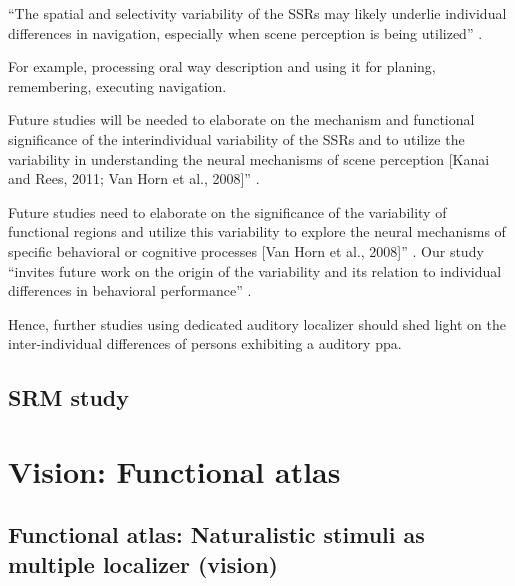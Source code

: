 ``The spatial and selectivity variability of the SSRs may likely underlie
individual differences in navigation, especially when scene perception is being
utilized'' \citep{zhen2017quantifying}.

%
For example, processing oral way description and using it for planing,
remembering, executing navigation.

%
Future studies will be needed to elaborate on the mechanism and functional
significance of the interindividual variability of the SSRs and to utilize the
variability in understanding the neural mechanisms of scene perception [Kanai
and Rees, 2011; Van Horn et al., 2008]'' \citep{zhen2017quantifying}.

%
Future studies need to elaborate on the significance of the variability of
functional regions and utilize this variability to explore the neural mechanisms
of specific behavioral or cognitive processes [Van Horn et al., 2008]''
\citep{zhen2015quantifying}.
%
Our study ``invites future work on the origin of the variability and its
relation to individual differences in behavioral performance''
\citep{zhen2015quantifying}.

%
Hence, further studies using dedicated auditory localizer should shed light on
the inter-individual differences of persons exhibiting a auditory \ac{ppa}.



\subsection{SRM study}





\section{Vision: Functional atlas}




\subsection{Functional atlas: Naturalistic stimuli as multiple localizer
(vision)}


